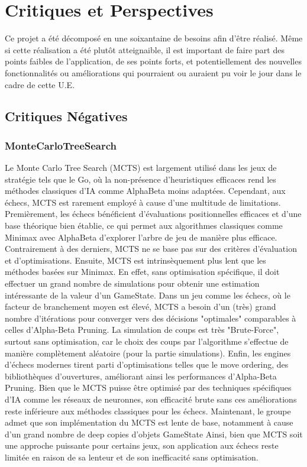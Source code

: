 \documentclass{article}
\begin{document}
\section{Critiques et Perspectives}
Ce projet a été décomposé en une soixantaine de besoins afin d'être réalisé. Même si cette réalisation a été plutôt atteignaible, il est important de
faire part des points faibles de l'application, de ses points forts, et potentiellement des nouvelles fonctionnalités ou améliorations qui pourraient ou 
auraient pu voir le jour dans le cadre de cette U.E.
\subsection{Critiques Négatives}
\subsubsection{MonteCarloTreeSearch}
Le Monte Carlo Tree Search (MCTS) est largement utilisé dans les jeux de stratégie tels que le Go, où la non-présence d'heuristiques efficaces rend les méthodes classiques d'IA comme AlphaBeta moins adaptées. Cependant, aux échecs, MCTS est rarement employé à cause d'une multitude de limitations.
Premièrement, les échecs bénéficient d'évaluations positionnelles efficaces et d'une base théorique bien établie, ce qui permet aux algorithmes classiques comme Minimax avec AlphaBeta d'explorer l'arbre de jeu de manière plus efficace. Contrairement à des derniers, MCTS ne se base pas sur des critères d'évaluation et d'optimisations. Ensuite, MCTS est intrinsèquement plus lent que les méthodes basées sur Minimax. En effet, sans optimisation spécifique, il doit effectuer un grand nombre de simulations pour obtenir une estimation intéressante de la valeur d'un GameState. Dans un jeu comme les échecs, où le facteur de branchement moyen est élevé, MCTS a besoin d'un (très) grand nombre d'itérations pour converger vers des décisions "optimales" comparables à celles d'Alpha-Beta Pruning. La simulation de coups est très "Brute-Force", surtout sans optimisation, car le choix des coups par l'algorithme s'effectue de manière complètement aléatoire (pour la partie simulations).
Enfin, les engines d'échecs modernes tirent parti d'optimisations telles que le move ordering, des bibliothèques d'ouvertures, améliorant ainsi les performances d'Alpha-Beta Pruning. Bien que le MCTS puisse être optimisé par des techniques spécifiques d'IA comme les réseaux de neuronnes, son efficacité brute sans ces améliorations reste inférieure aux méthodes classiques pour les échecs. Maintenant, le groupe admet que son implémentation du MCTS est 
lente de base, notamment à cause d'un grand nombre de deep copies d'objets GameState
Ainsi, bien que MCTS soit une approche puissante pour certains jeux, son application aux échecs reste limitée en raison de sa lenteur et de son inefficacité sans optimisation.
\end{document}
